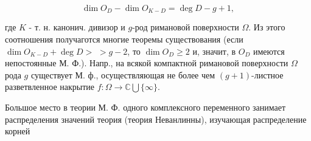 \documentclass[10pt]{article}
\begin{document}
\[

\operatorname{dim} O_{D}-\operatorname{dim} O_{K-D}=\operatorname{deg} D-g+1,

\]



где $K$ - т. н. канонич. дивизор и $g$-род римановой поверхности $\Omega$. Из этого соотношения получаготся многие теоремы существования (если $\operatorname{dim} O_{K-D}+\operatorname{deg} D>$ $>g-2$, то $\operatorname{dim} O_{D} \geqslant 2$ и, значит, в $O_{D}$ имеются непостоянные М. Ф.). Напр., на всякой компактной римановой поверхности $\Omega$ рода $g$ существует М. ф., осуществляющая не более чем $(g+1)$-листное разветвленное накрытие $f: \Omega \rightarrow \mathbb{C} \bigcup\{\infty\}$.



Большое место в теории М. Ф. одного комплексного переменного занимает распределения значений теория (теория Неванлинны), изучающая распределение корней
\end{document}
